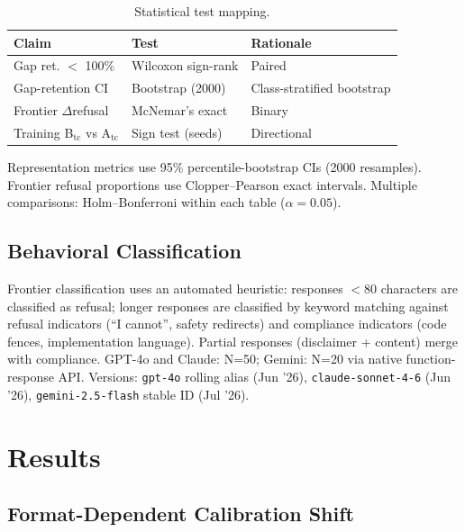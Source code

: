 \documentclass[conference]{IEEEtran}
\begin{document}
\begin{table}[t]
\caption{Statistical test mapping.}
\label{tab:stats}
\centering
\footnotesize
\begin{tabular}{lll}
\toprule
Claim & Test & Rationale \\
\midrule
Gap ret. $<$ 100\% & Wilcoxon sign-rank & Paired \\
Gap-retention CI & Bootstrap (2000) & Class-stratified bootstrap \\
Frontier $\Delta$refusal & McNemar's exact & Binary \\
Training B$_{\text{tc}}$ vs A$_{\text{tc}}$ & Sign test (seeds) & Directional \\
\bottomrule
\end{tabular}
\end{table}

Representation metrics use 95\% percentile-bootstrap CIs (2000 resamples). Frontier refusal proportions use Clopper--Pearson exact intervals. Multiple comparisons: Holm--Bonferroni within each table ($\alpha = 0.05$).

\subsection{Behavioral Classification}

Frontier classification uses an automated heuristic: responses $<$80 characters are classified as refusal; longer responses are classified by keyword matching against refusal indicators (``I cannot'', safety redirects) and compliance indicators (code fences, implementation language). Partial responses (disclaimer + content) merge with compliance. GPT-4o and Claude: N=50; Gemini: N=20 via native function-response API. Versions: \texttt{gpt-4o} rolling alias (Jun '26), \texttt{claude-sonnet-4-6} (Jun '26), \texttt{gemini-2.5-flash} stable ID (Jul '26).

\section{Results}
\label{sec:results}

\subsection{Format-Dependent Calibration Shift}
\end{document}

